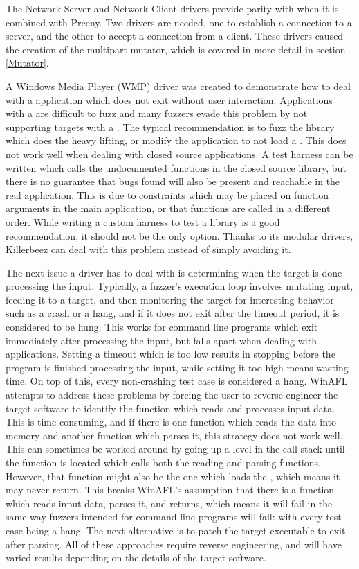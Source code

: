 The Network Server and Network Client drivers provide parity with \AFL{} when it
is combined with Preeny.\cite{preeny}  Two drivers are needed, one to establish
a connection to a server, and the other to accept a connection from a
client. These drivers caused the creation of the multipart mutator,
which is covered in more detail in section \ref{Mutator}.

A Windows Media Player (WMP) driver was created to demonstrate how to deal with
a \GUI{} application which does not exit without user interaction. Applications
with a \GUI{} are difficult to fuzz and many fuzzers evade this problem by not
supporting targets with a \GUI{}.  The typical recommendation is to fuzz the library
which does the heavy lifting, or modify the application to not load a \GUI{}.
This does not work well when dealing with closed source applications. A test
harness can be written which calls the undocumented functions in the closed
source library, but there is no guarantee that bugs found will also be present
and reachable in the real application.  This is due to constraints which may
be placed on function arguments in the main application, or that functions are
called in a different order.  While writing a custom harness to test a library
is a good recommendation, it should not be the only option. Thanks to its
modular drivers, Killerbeez can deal with this problem instead of simply avoiding it.

The next issue a driver has to deal with is determining when the target is done
processing the input.
Typically, a fuzzer's execution loop involves mutating input, feeding it to a
target, and then monitoring the target for interesting behavior such as a crash
or a hang, and if it does not exit after the timeout period, it is considered to
be hung.  This works for command line programs which exit immediately after processing
the input, but falls apart when dealing with \GUI{} applications.
Setting a timeout which is too low results in stopping before the
program is finished processing the input, while setting it too high means
wasting time. On top of this, every non-crashing test case is considered
a hang. WinAFL attempts to address these problems by forcing the user to
reverse engineer the target software to identify the function which reads and
processes input data.  This is time consuming, and if there is one function
which reads the data into memory and another function which parses it, this
strategy does not work well. This can sometimes be worked around by going up
a level in the call stack until the function is located which calls both the reading and parsing functions.
However, that function might also be the one which loads the \GUI{}, which means
it may never return. This breaks WinAFL's assumption that there is a function
which reads input data, parses it, and returns, which means it will fail in the
same way fuzzers intended for command line programs will fail: with every test
case being a hang.  The next alternative is to patch the target executable
to exit after parsing. All of these approaches require reverse engineering,
and will have varied results depending on the details of the target software.

